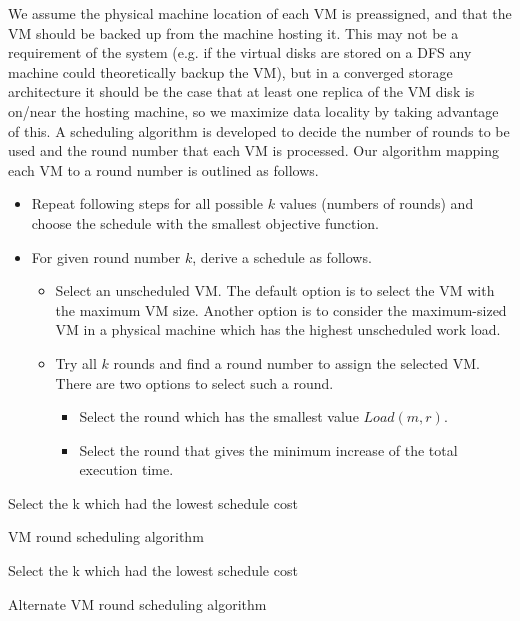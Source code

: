 We assume the physical machine location of each VM is preassigned, and that the
VM should be backed up from the machine hosting it.  This may not be a
requirement of the system (e.g. if the virtual disks are stored on a DFS any
machine could theoretically backup the VM), but in a converged storage
architecture it should be the case that at least one replica of the VM disk is
on/near the hosting machine, so we maximize data locality by taking advantage
of this. A scheduling algorithm is developed to decide the number of rounds to
be used and the round number that each VM is processed.  Our algorithm mapping
each VM to a round number is outlined as follows.
\begin{itemize}
\item Repeat following steps for all possible $k$ values (numbers of rounds) and choose the schedule
with the smallest objective function.
\item For given round number $k$, derive  a schedule as follows.
	\begin{itemize}
	\item Select an unscheduled VM. The default option is to select the VM with the maximum VM size.
Another option is to consider the maximum-sized VM in a physical machine which has the highest 
unscheduled work load.
	\item Try all $k$ rounds and find a round number  to assign the selected VM. 
There are two options to select such a round.
		\begin{itemize}
		\item Select the round which has the smallest value $Load(m,r)$.
		\item Select the round that  gives the minimum increase of the total execution time.
		\end{itemize}
	\end{itemize}
\end{itemize}

\begin{algorithm}
Select the k which had the lowest schedule cost\;
\caption{VM round scheduling algorithm}
\end{algorithm}

\begin{algorithm}
Select the k which had the lowest schedule cost\;
\caption{Alternate VM round scheduling algorithm}
\end{algorithm}



